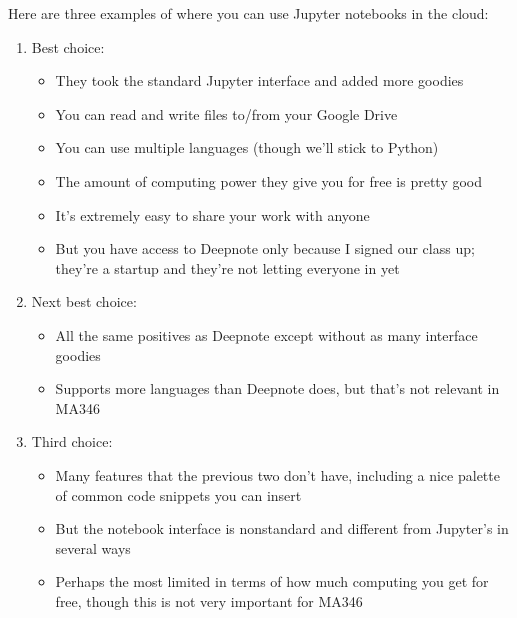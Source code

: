 \documentclass[letterpaper,10pt,english]{sphinxmanual}
\begin{document}
Here are three examples of where you can use Jupyter notebooks in the cloud:
\begin{enumerate}
%
\item {} 
Best choice: 
\begin{itemize}
\item {} 
They took the standard Jupyter interface and added more goodies

\item {} 
You can read and write files to/from your Google Drive

\item {} 
You can use multiple languages (though we’ll stick to Python)

\item {} 
The amount of computing power they give you for free is pretty good

\item {} 
It’s extremely easy to share your work with anyone

\item {} 
But you have access to Deepnote only because I signed our class up; they’re a startup and they’re not letting everyone in yet

\end{itemize}

\item {} 
Next best choice: 
\begin{itemize}
\item {} 
All the same positives as Deepnote except without as many interface goodies

\item {} 
Supports more languages than Deepnote does, but that’s not relevant in MA346

\end{itemize}

\item {} 
Third choice: 
\begin{itemize}
\item {} 
Many features that the previous two don’t have, including a nice palette of common code snippets you can insert

\item {} 
But the notebook interface is nonstandard and different from Jupyter’s in several ways

\item {} 
Perhaps the most limited in terms of how much computing you get for free, though this is not very important for MA346

\end{itemize}

\end{enumerate}
\end{document}
